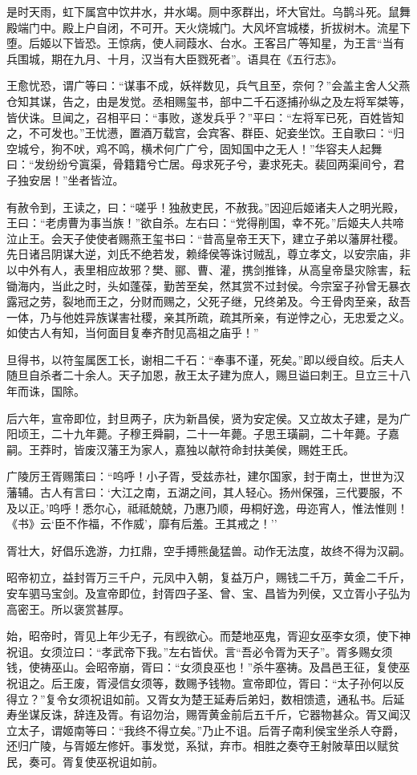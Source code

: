 \documentclass[]{article}
\begin{document}
是时天雨，虹下属宫中饮井水，井水竭。厕中豕群出，坏大官灶。乌鹊斗死。鼠舞殿端门中。殿上户自闭，不可开。天火烧城门。大风坏宫城楼，折拔树木。流星下堕。后姬以下皆恐。王惊病，使人祠葭水、台水。王客吕广等知星，为王言``当有兵围城，期在九月、十月，汉当有大臣戮死者''。语具在《五行志》。

王愈忧恐，谓广等曰：``谋事不成，妖祥数见，兵气且至，奈何？''会盖主舍人父燕仓知其谋，告之，由是发觉。丞相赐玺书，部中二千石逐捕孙纵之及左将军桀等，皆伏诛。旦闻之，召相平曰：``事败，遂发兵乎？''平曰：``左将军已死，百姓皆知之，不可发也。''王忧懑，置酒万载宫，会宾客、群臣、妃妾坐饮。王自歌曰：``归空城兮，狗不吠，鸡不鸣，横术何广广兮，固知国中之无人！''华容夫人起舞曰：``发纷纷兮寘渠，骨籍籍兮亡居。母求死子兮，妻求死夫。裴回两渠间兮，君子独安居！''坐者皆泣。

有赦令到，王读之，曰：``嗟乎！独赦吏民，不赦我。''因迎后姬诸夫人之明光殿，王曰：``老虏曹为事当族！''欲自杀。左右曰：``党得削国，幸不死。''后姬夫人共啼泣止王。会天子使使者赐燕王玺书曰：``昔高皇帝王天下，建立子弟以藩屏社稷。先日诸吕阴谋大逆，刘氏不绝若发，赖绛侯等诛讨贼乱，尊立孝文，以安宗庙，非以中外有人，表里相应故邪？樊、郦、曹、灌，携剑推锋，从高皇帝垦灾除害，耘锄海内，当此之时，头如蓬葆，勤苦至矣，然其赏不过封侯。今宗室子孙曾无暴衣露冠之劳，裂地而王之，分财而赐之，父死子继，兄终弟及。今王骨肉至亲，敌吾一体，乃与他姓异族谋害社稷，亲其所疏，疏其所亲，有逆悖之心，无忠爱之义。如使古人有知，当何面目复奉齐酎见高祖之庙乎！''

旦得书，以符玺属医工长，谢相二千石：``奉事不谨，死矣。''即以绶自绞。后夫人随旦自杀者二十余人。天子加恩，赦王太子建为庶人，赐旦谥曰刺王。旦立三十八年而诛，国除。

后六年，宣帝即位，封旦两子，庆为新昌侯，贤为安定侯。又立故太子建，是为广阳顷王，二十九年薨。子穆王舜嗣，二十一年薨。子思王璜嗣，二十年薨。子嘉嗣。王莽时，皆废汉藩王为家人，嘉独以献符命封扶美侯，赐姓王氏。

广陵厉王胥赐策曰：``呜呼！小子胥，受兹赤社，建尔国家，封于南土，世世为汉藩辅。古人有言曰：`大江之南，五湖之间，其人轻心。扬州保强，三代要服，不及以正。'呜呼！悉尔心，祗祗兢兢，乃惠乃顺，毋桐好逸，毋迩宵人，惟法惟则！《书》云`臣不作福，不作威'，靡有后羞。王其戒之！''

胥壮大，好倡乐逸游，力扛鼎，空手搏熊彘猛兽。动作无法度，故终不得为汉嗣。

昭帝初立，益封胥万三千户，元凤中入朝，复益万户，赐钱二千万，黄金二千斤，安车驷马宝剑。及宣帝即位，封胥四子圣、曾、宝、昌皆为列侯，又立胥小子弘为高密王。所以褒赏甚厚。

始，昭帝时，胥见上年少无子，有觊欲心。而楚地巫鬼，胥迎女巫李女须，使下神祝诅。女须泣曰：``孝武帝下我。''左右皆伏。言``吾必令胥为天子''。胥多赐女须钱，使祷巫山。会昭帝崩，胥曰：``女须良巫也！''杀牛塞祷。及昌邑王征，复使巫祝诅之。后王废，胥浸信女须等，数赐予钱物。宣帝即位，胥曰：``太子孙何以反得立？''复令女须祝诅如前。又胥女为楚王延寿后弟妇，数相馈遗，通私书。后延寿坐谋反诛，辞连及胥。有诏勿治，赐胥黄金前后五千斤，它器物甚众。胥又闻汉立太子，谓姬南等曰：``我终不得立矣。''乃止不诅。后胥子南利侯宝坐杀人夺爵，还归广陵，与胥姬左修奸。事发觉，系狱，弃市。相胜之奏夺王射陂草田以赋贫民，奏可。胥复使巫祝诅如前。
\end{document}
